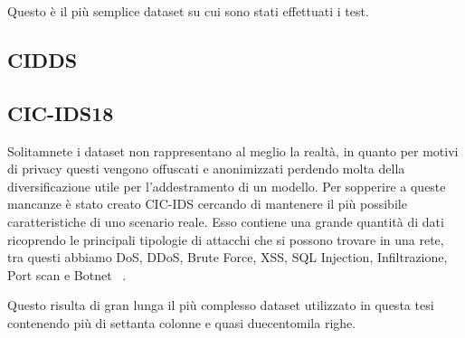 Questo è il più semplice dataset su cui sono stati effettuati i test.

\subsection{CIDDS}


\subsection{CIC-IDS18}

Solitamnete i dataset non rappresentano al meglio la realtà, in quanto per motivi di privacy questi vengono offuscati e anonimizzati perdendo molta della diversificazione utile per l'addestramento di un modello.
Per sopperire a queste mancanze è stato creato CIC-IDS cercando di mantenere il più possibile caratteristiche di uno scenario reale.
Esso contiene una grande quantità di dati ricoprendo le principali tipologie di attacchi che si possono trovare in una rete, tra questi abbiamo DoS, DDoS, Brute Force, XSS, SQL Injection, Infiltrazione, Port scan e Botnet ~\cite{sharafaldinGeneratingNewIntrusion2018}.

Questo risulta di gran lunga il più complesso dataset utilizzato in questa tesi contenendo più di settanta colonne e quasi duecentomila righe.

